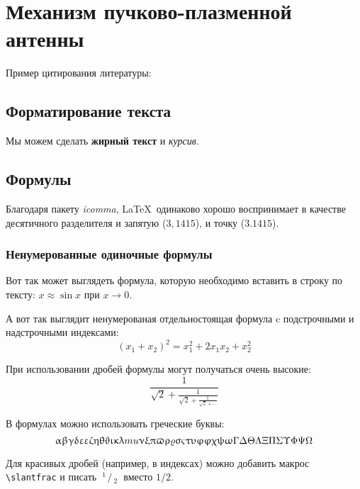\chapter{Механизм пучково-плазменной антенны} \label{chapt1}

Пример цитирования литературы: \cite{Annenkov2016a,Arzhannikov2015,Timofeev2015}

\section{Форматирование текста} \label{sect1_1}

Мы можем сделать \textbf{жирный текст} и \textit{курсив}.



\section{Формулы} \label{sect1_3}

Благодаря пакету \textit{icomma}, \LaTeX~одинаково хорошо воспринимает в качестве десятичного разделителя и запятую ($3,1415$), и точку ($3.1415$).

\subsection{Ненумерованные одиночные формулы} \label{subsect1_3_1}

Вот так может выглядеть формула, которую необходимо вставить в строку по тексту: $x \approx \sin x$ при $x \to 0$.

А вот так выглядит ненумерованая отдельностоящая формула c подстрочными и надстрочными индексами:
\[
(x_1+x_2)^2 = x_1^2 + 2 x_1 x_2 + x_2^2
\]

При использовании дробей формулы могут получаться очень высокие:
\[
\frac{1}{\sqrt{2}+
	\displaystyle\frac{1}{\sqrt{2}+
		\displaystyle\frac{1}{\sqrt{2}+\cdots}}}
\]

В формулах можно использовать греческие буквы:
\[
\alpha\beta\gamma\delta\epsilon\varepsilon\zeta\eta\theta\vartheta\iota\kappa\lambda\\mu\nu\xi\pi\varpi\rho\varrho\sigma\varsigma\tau\upsilon\phi\varphi\chi\psi\omega\Gamma\Delta\Theta\Lambda\Xi\Pi\Sigma\Upsilon\Phi\Psi\Omega
\]

\def\slantfrac#1#2{ \hspace{3pt}\!^{#1}\!\!\hspace{1pt}/
	\hspace{2pt}\!\!_{#2}\!\hspace{3pt}
} %
Для красивых дробей (например, в индексах) можно добавить макрос
\verb+\slantfrac+ и писать $\slantfrac{1}{2}$ вместо $1/2$.


